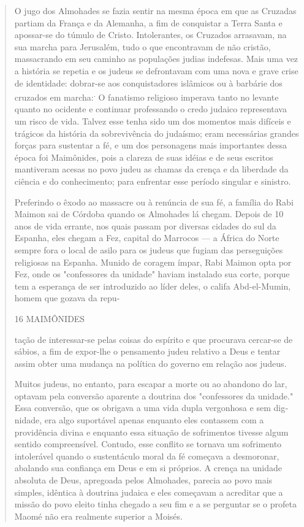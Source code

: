 \begin{quote}
O jugo dos Almohades se fazia sentir na mesma época em que as Cru­zadas
partiam da França e da Alemanha, a fim de conquistar a Terra Santa e
apossar-se do túmulo de Cristo. Intolerantes, os Cruzados arrasavam, na
sua mar­cha para Jerusalém, tudo o que encontravam de não cristão,
massacrando em seu caminho as populações judias indefesas. Mais uma vez
a história se repetia e os judeus se defrontavam com uma nova e grave
crise de identidade: dobrar-se aos conquistadores islâmicos ou à
barbárie dos cruzados em marcha:\textsuperscript{.} O fana­tismo
religioso imperava tanto no levante quanto no ocidente e continuar
pro­fessando o credo judaico representava um risco de vida. Talvez esse
tenha sido um dos momentos mais difíceis e trágicos da história da
sobrevivência do ju­daísmo; eram necessárias grandes forças para
sustentar a fé, e um dos persona­gens mais importantes dessa época foi
Maimônides, pois a clareza de suas idéias e de seus escritos mantiveram
acesas no povo judeu as chamas da crença e da liberdade da ciência e do
conhecimento; para enfrentar esse período singular e sinistro.

Preferindo o êxodo ao massacre ou à renúncia de sua fé, a família do
Rabi Maimon sai de Córdoba quando os Almohades lá chegam. Depois de 10
anos de vida errante, nos quais passam por diversas cidades do sul da
Espa­nha, eles chegam a Fez, capital do Marrocos --- a África do Norte
sempre fora o local de asilo para os judeus que fugiam das perseguições
religiosas na Espa­nha. Munido de coragem ímpar, Rabi Maimon opta por
Fez, onde os "confes­sores da unidade" haviam instalado sua corte,
porque tem a esperança de ser introduzido ao líder deles, o califa
Abd-el-Mumin, homem que gozava da repu-

16 MAIMÔNIDES

tação de interessar-se pelas coisas do espírito e que procurava
cercar-se de sá­bios, a fim de expor-lhe o pensamento judeu relativo a
Deus e tentar assim ob­ter uma mudança na política do governo em relação
aos judeus.

Muitos judeus, no entanto, para escapar a morte ou ao abandono do lar,
optavam pela conversão aparente a doutrina dos "confessores da
unida­de." Essa conversão, que os obrigava a uma vida dupla vergonhosa e
sem dig­nidade, era algo suportável apenas enquanto eles contassem com a
providência divina e enquanto essa situação de sofrimentos tivesse algum
sentido compreen­sível. Contudo, esse conflito se tornava um sofrimento
intolerável quando o sustentáculo moral da fé começava a desmoronar,
abalando sua confiança em Deus e em si próprios. A crença na unidade
absoluta de Deus, apregoada pelos Almohades, parecia ao povo mais
simples, idêntica à doutrina judaica e eles co­meçavam a acreditar que a
missão do povo eleito tinha chegado a seu fim e a se perguntar se o
profeta Maomé não era realmente superior a Moisés.


\end{quote}
